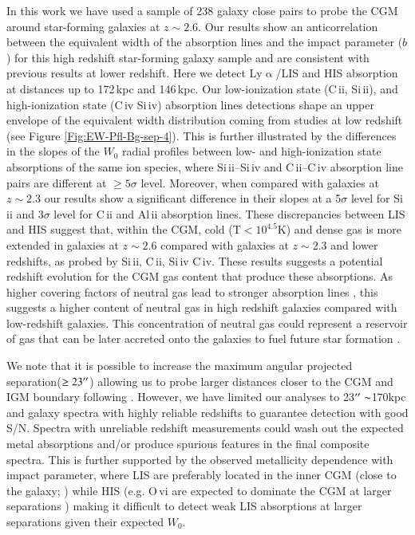 \documentclass[longauth]{aa}
\begin{document}
In this work we have used a sample of 238 galaxy close pairs to probe the CGM
around star-forming galaxies at $z\sim2.6$. Our results show an
anticorrelation between the equivalent width of the absorption lines and the
impact parameter ($b$) for this high redshift star-forming galaxy sample and
are consistent with previous results at lower redshift. Here we detect
Ly$\upalpha$/LIS and HIS absorption at distances up to 172\,kpc and 146\,kpc. 
Our low-ionization state (C\,{\sc ii}, Si\,{\sc ii}), and
high-ionization state (C\,{\sc iv} Si\,{\sc iv}) absorption lines detections
shape an upper envelope of the equivalent width distribution coming from
studies at low redshift (see Figure \ref{Fig:EW-Pfl-Bg-sep-4}). This is
further illustrated by the differences in the slopes of the $W_{0}$ radial
profiles between low- and high-ionization state absorptions of the same ion
species, where Si\,{\sc ii}--Si\,{\sc iv} and C\,{\sc ii}--C\,{\sc iv}
absorption line pairs are different at $\geq5\sigma$ level. Moreover, when
compared with galaxies at $z\sim2.3$ \citep{Steidel10} our results show a
significant difference in their slopes at a 5$\sigma$ level for Si\,{\sc ii}
and 3$\sigma$ level for C\,{\sc ii} and Al\,{\sc ii} absorption lines. These
discrepancies between LIS and HIS suggest that, within the CGM, cold (T$<10^
{4.5}$K) and dense gas is more extended in galaxies at $z\sim2.6$ compared
with galaxies at $z\sim2.3$ and lower redshifts, as probed by Si\,{\sc ii},
C\,{\sc ii}, Si\,{\sc iv} C\,{\sc iv}. These results suggests a potential
redshift evolution for the CGM gas content that produce these absorptions. As
higher covering factors of neutral gas lead to stronger absorption
lines \citep{Du18}, this suggests a higher content of neutral gas in high
redshift galaxies compared with low-redshift galaxies. This concentration of
neutral gas could represent a reservoir of gas that can be later accreted
onto the galaxies to fuel future star formation \citep{Hafen19,Hafen20}.

We note that it is possible to increase the maximum angular projected
separation($\geq23^{\prime\prime}$) allowing us to probe larger distances closer to
the CGM and IGM boundary following \cite{Chen20}. However, we have limited
our analyses to 23$^{\prime\prime}\sim$170kpc and galaxy spectra with highly reliable
redshifts to guarantee detection with good S/N. Spectra with unreliable
redshift measurements could wash out the expected metal absorptions and/or
produce spurious features in the final composite spectra. This is further
supported by the observed metallicity dependence with impact parameter, where
LIS are preferably located in the inner CGM (close to the
galaxy; \citealt{Lau16}) while HIS (e.g. O\,{\sc vi} are expected to dominate
the CGM at larger separations \citealt{Shen13}) making it difficult to detect
weak LIS absorptions at larger separations given their expected $W_{0}$.
\end{document}
